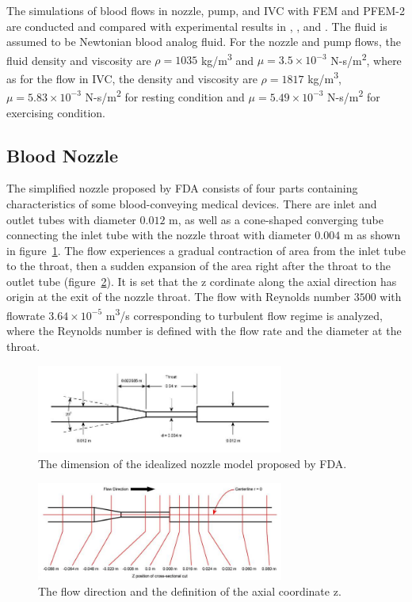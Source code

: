 The simulations of blood flows in nozzle, pump, and IVC with FEM and PFEM-2 are conducted and compared with experimental results in \cite{fda_res}, \cite{fda_nozzle}, \cite{fda_pump} and \cite{gallagher_exp}. The fluid is assumed to be Newtonian blood analog fluid. For the nozzle and pump flows, the fluid density and viscosity are $\rho= 1035$ kg/m\textsuperscript{3} and $\mu =3.5\times10^{-3}$ N-s/m\textsuperscript{2}, where as for the flow in IVC, the density and viscosity are $\rho=1817$ kg/m\textsuperscript{3}, $\mu=5.83\times10^{-3}$ N-s/m\textsuperscript{2} for resting condition and $\mu=5.49\times10^{-3}$ N-s/m\textsuperscript{2} for exercising condition. 

\subsection{Blood Nozzle}

The simplified nozzle proposed by FDA consists of four parts containing characteristics of some blood-conveying medical devices. There are inlet and outlet tubes with diameter $0.012$ m, as well as a cone-shaped converging tube connecting the inlet tube with the nozzle throat with diameter $0.004$ m as shown in figure~\ref{fig:nozzlegeo1}. The flow experiences a gradual contraction of area from the inlet tube to the throat, then a sudden expansion of the area right after the throat to the outlet tube (figure~\ref{fig:nozzlegeo2}). It is set that the z cordinate along the axial direction has origin at the exit of the nozzle throat. The flow with Reynolds number $3500$ with flowrate $3.64\times10^{-5}$ m\textsuperscript{3}/s corresponding to turbulent flow regime is analyzed, where the Reynolds number is defined with the flow rate and the diameter at the throat. 

\begin{figure}[htbp]
    \centering
    \includegraphics[width=3.2in]{imgs/nozzle_pump/nozzle_geo.jpg}
    \caption{The dimension of the idealized nozzle model proposed by FDA.}
    \label{fig:nozzlegeo1}
\end{figure}
\begin{figure}[htbp]
    \centering
    \includegraphics[width=3.2in]{imgs/nozzle_pump/nozzle_CS.jpg}
    \caption{The flow direction and the definition of the axial coordinate z.}
    \label{fig:nozzlegeo2}
\end{figure}


